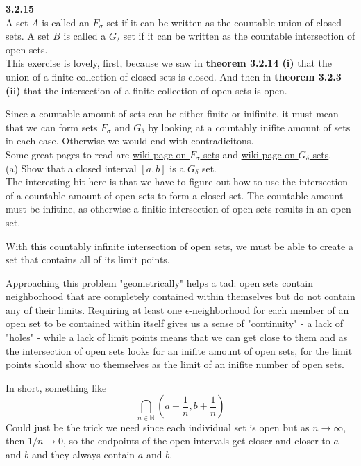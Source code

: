 \label{abbott:3.2.15}
\textbf{3.2.15}
\\

A set $A$ is called an $F_\sigma$ set if it can be written as the countable union of closed sets.
A set $B$ is called a $G_\delta$ set if it can be written as the countable intersection of open sets.
\\

This exercise is lovely, first, because we saw in \textbf{theorem 3.2.14 (i)} that the union of a
finite collection of closed sets is closed.
And then in \textbf{theorem 3.2.3 (ii)} that the intersection of a finite collection of open sets is open.

Since a countable amount of sets can be either finite or inifinite, it must mean that we can form
sets $F_\sigma$ and $G_\delta$ by looking at a countably inifite amount of sets in each case.
Otherwise we would end with contradicitons.
\\

Some great pages to read are \href{https://en.wikipedia.org/wiki/F%CF%83_set}{wiki page on $F_\sigma$ sets}
and \href{https://en.wikipedia.org/wiki/G%CE%B4_set}{wiki page on $G_\delta$ sets}.
\\


(a) Show that a closed interval $[a,b]$ is a $G_\delta$ set.
\\

The interesting bit here is that we have to figure out how to use the intersection of a countable amount
of open sets to form a closed set.
The countable amount must be infitine, as otherwise a finitie intersection of open sets results in an open set.

With this countably infinite intersection of open sets, we must be able to create a set that contains all of its
limit points.

Approaching this problem "geometrically" helps a tad: open sets contain neighborhood that are completely contained within
themselves but do not contain any of their limits.
Requiring at least one $\epsilon$-neighborhood for each member of an open set to be contained within itself
gives us a sense of "continuity" - a lack of "holes" - while a lack of limit points means that we can get close
to them and as the intersection of open sets looks for an inifite amount of open sets, for the limit points should
show uo themselves as the limit of an inifite number of open sets.

In short, something like
$$
\bigcap_{n\in\mathbb{N}} \left( a-\frac{1}{n}, b+\frac{1}{n} \right)
$$
Could just be the trick we need since each individual set is open but as $n\rightarrow\infty$,
then $1/n \rightarrow 0$, so the endpoints of the open intervals get closer and closer to $a$ and $b$
and they always contain $a$ and $b$.
\\~\\


